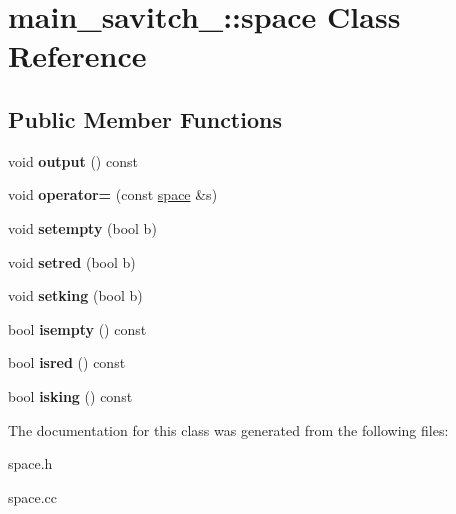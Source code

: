 \hypertarget{classmain__savitch__14_1_1space}{}\section{main\+\_\+savitch\+\_\+:\+:space Class Reference}
\label{classmain__savitch__14_1_1space}
\subsection*{Public Member Functions}
\begin{DoxyCompactItemize}
\item 
\mbox{\label{classmain__savitch__14_1_1space_ae84e9dcd39558b5555ead492bd0e3090}} 
void {\bfseries output} () const
\item 
\mbox{\label{classmain__savitch__14_1_1space_a69bbbde78eb80714e40fe9797155ff97}} 
void {\bfseries operator=} (const \hyperlink{classmain__savitch__14_1_1space}{space} \&s)
\item 
\mbox{\label{classmain__savitch__14_1_1space_a81042116b78c65aa54681a3046cf729e}} 
void {\bfseries setempty} (bool b)
\item 
\mbox{\label{classmain__savitch__14_1_1space_aec4e5034b7016efd659f2ca73646ce68}} 
void {\bfseries setred} (bool b)
\item 
\mbox{\label{classmain__savitch__14_1_1space_a1d05ca01c48db5a08c3e4696714f2a60}} 
void {\bfseries setking} (bool b)
\item 
\mbox{\label{classmain__savitch__14_1_1space_ae29a747b426a5da674f25a17f3c311b3}} 
bool {\bfseries isempty} () const
\item 
\mbox{\label{classmain__savitch__14_1_1space_a40b1e916c254b78bd374599727c5753e}} 
bool {\bfseries isred} () const
\item 
\mbox{\label{classmain__savitch__14_1_1space_af4d5052a2c369cfac07587933958e3c5}} 
bool {\bfseries isking} () const
\end{DoxyCompactItemize}


The documentation for this class was generated from the following files\+:\begin{DoxyCompactItemize}
\item 
space.\+h\item 
space.\+cc\end{DoxyCompactItemize}
